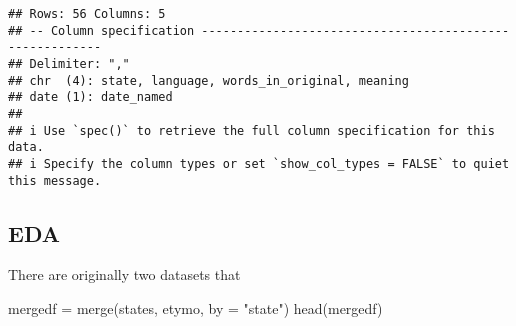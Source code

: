 \documentclass[
]{article}
\newenvironment{Shaded}{\begin{snugshade}}{\end{snugshade}}
\newcommand{\AttributeTok}[1]{\textcolor[rgb]{0.77,0.63,0.00}{#1}}
\newcommand{\FunctionTok}[1]{\textcolor[rgb]{0.00,0.00,0.00}{#1}}
\newcommand{\NormalTok}[1]{#1}
\newcommand{\OtherTok}[1]{\textcolor[rgb]{0.56,0.35,0.01}{#1}}
\newcommand{\StringTok}[1]{\textcolor[rgb]{0.31,0.60,0.02}{#1}}
\begin{document}
\begin{verbatim}
## Rows: 56 Columns: 5
## -- Column specification --------------------------------------------------------
## Delimiter: ","
## chr  (4): state, language, words_in_original, meaning
## date (1): date_named
## 
## i Use `spec()` to retrieve the full column specification for this data.
## i Specify the column types or set `show_col_types = FALSE` to quiet this message.
\end{verbatim}

\hypertarget{eda}{%
\subsection{EDA}\label{eda}}

There are originally two datasets that

\begin{Shaded}
\begin{Highlighting}[]
\NormalTok{mergedf }\OtherTok{=} \FunctionTok{merge}\NormalTok{(states, etymo, }\AttributeTok{by =} \StringTok{"state"}\NormalTok{)}
\FunctionTok{head}\NormalTok{(mergedf)}
\end{Highlighting}
\end{Shaded}
\end{document}
